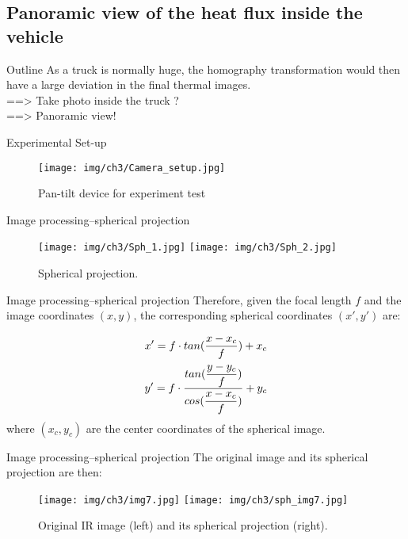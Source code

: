 \subsection{Panoramic view of the heat flux inside the vehicle}

\begin{frame}{Outline}
 As a truck is normally huge, the homography transformation would then have a large deviation in the final thermal images.\\
 \pause
 ==> Take photo inside the truck ?\\
 \pause
 ==> \alert{Panoramic view!}
\end{frame}


\begin{frame}{Experimental Set-up}
    \begin{figure}[ht]
        \centering
        \texttt{[image: img/ch3/Camera\_setup.jpg]}
        \caption{Pan-tilt device for experiment test}
    \end{figure}
\end{frame}


\begin{frame}{Image processing--\small{spherical projection}}
    \begin{figure}
        \hspace*{-15pt}
        \texttt{[image: img/ch3/Sph\_1.jpg]}
        \texttt{[image: img/ch3/Sph\_2.jpg]}
        \caption{Spherical projection.}
        \label{Sph_pro}
    \end{figure}
\end{frame}

\begin{frame}{Image processing--\small{spherical projection}}
Therefore, given the focal length $ f $ and the image coordinates $ (x, y) $, the corresponding spherical coordinates $ (x', y') $ are:

    \begin{align*}
        x'={} f \cdot tan(\dfrac{x-x_c}{f})+x_c \notag \\
        y'=f \cdot \frac{tan(\dfrac{y-y_c}{f})}{cos(\dfrac{x-x_c}{f})} +y_c
    \end{align*}
where $ (x_c,y_c) $ are the center coordinates of the spherical image.

\end{frame}


\begin{frame}{Image processing--\small{spherical projection}}
The original image and its spherical projection are then:
    \begin{figure}
        \hspace*{-15pt}
        \texttt{[image: img/ch3/img7.jpg]}
        \texttt{[image: img/ch3/sph\_img7.jpg]}
        \caption{Original IR image (left) and its spherical projection (right).}
        \label{Orig_sph}
    \end{figure}
\end{frame}


